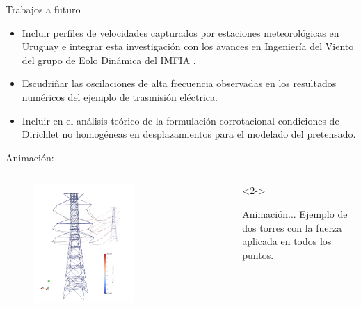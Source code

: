 \documentclass[
  aspectratio=169,
]{beamer}
\begin{document}
\begin{small}
\begin{frame}{Trabajos a futuro }
\begin{itemize}
		\pause
		\item Incluir perfiles de velocidades capturados por estaciones meteorológicas en Uruguay e integrar esta investigación con los avances en Ingeniería del Viento del grupo de Eolo Dinámica del IMFIA . 
		\pause 
		\item  Escudriñar  las oscilaciones de alta frecuencia observadas en los resultados numéricos del ejemplo de trasmisión eléctrica.
		\pause 
		\item Incluir en el análisis teórico de la formulación corrotacional condiciones de Dirichlet no homogéneas en desplazamientos para el modelado del pretensado.
	\end{itemize}
\end{frame}
\begin{frame}[t]{Animación:}
	\begin{columns}[T,onlytextwidth]
		\begin{column}{.58\textwidth}
			\begin{minipage}{\textwidth}
				\vspace{-.5cm}
				\begin{figure}[htbp]
					\centering
				\includegraphics[width=0.6\textwidth]{./imagenes/ResultadosNumericos/TransmissionTormenta/Perspectiva.png}
				\end{figure}
			\end{minipage}  
		\end{column}
		\begin{column}{.4\textwidth}
			\begin{onlyenv}<2->
				\begin{minipage}{\textwidth}
					\begin{block}{Animación...}
						Ejemplo de dos torres con la fuerza aplicada en todos los puntos. 
					\end{block}
				\end{minipage}
			\end{onlyenv}
		\end{column}
	\end{columns}
\end{frame}


\end{small}
\end{document}
